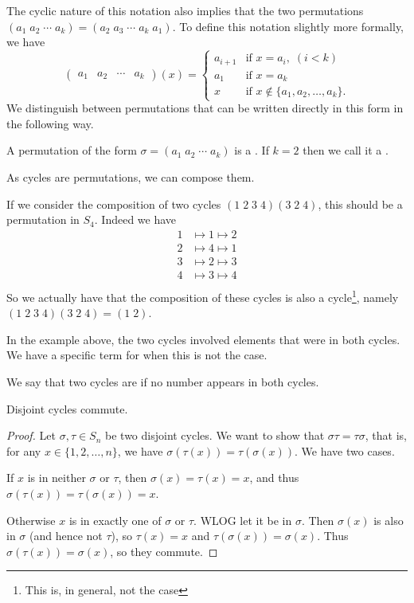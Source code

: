 \documentclass[a4]{scrreprt}
\begin{document}
The cyclic nature of this notation also implies that the two permutations $(a_1\; a_2\; \cdots\; a_k) = (a_2\; a_3\; \cdots\; a_k\; a_1)$. To define this notation slightly more formally, we have
$$
\begin{pmatrix}
	a_1 & a_2 & \cdots & a_k
\end{pmatrix} (x) = \begin{cases}
	a_{i + 1} &\mbox{if } x = a_i, \; (i < k) \\
	a_1 &\mbox{if } x = a_k \\
	x &\mbox{if } x \not \in \{a_1, a_2, \dots, a_k\}.
   \end{cases}
$$
We distinguish between permutations that can be written directly in this form in the following way.
\begin{definition}
	A permutation of the form $\sigma = (a_1\; a_2\; \cdots\; a_k)$ is a . If $k = 2$ then we call it a .
\end{definition}

As cycles are permutations, we can compose them.
\begin{example}
If we consider the composition of two cycles $(1\; 2\; 3\; 4)(3 \; 2\; 4)$, this should be a permutation in $S_4$. Indeed we have
\begin{align*}
	1 &\longmapsto 1 \longmapsto 2 \\
	2 &\longmapsto 4 \longmapsto 1 \\
	3 &\longmapsto 2 \longmapsto 3 \\
	4 &\longmapsto 3 \longmapsto 4 \\
\end{align*}
So we actually have that the composition of these cycles is also a cycle\footnote{This is, in general, not the case}, namely $(1\; 2\; 3\; 4)(3 \; 2\; 4) = (1\; 2)$. 
\end{example}

In the example above, the two cycles involved elements that were in both cycles. We have a specific term for when this is not the case.

\begin{definition}
	We say that two cycles are  if no number appears in both cycles.
\end{definition}
\begin{lemma}
	Disjoint cycles commute.
\end{lemma}
\begin{proof}
	Let $\sigma, \tau \in S_n$ be two disjoint cycles. We want to show that $\sigma \tau = \tau \sigma$, that is, for any $x \in \{1, 2, \dots, n\}$, we have $\sigma(\tau(x)) = \tau(\sigma(x))$. We have two cases.

	If $x$ is in neither $\sigma$ or $\tau$, then $\sigma(x) = \tau(x) = x$, and thus $\sigma(\tau(x)) = \tau(\sigma(x)) = x$.

	Otherwise $x$ is in exactly one of $\sigma$ or $\tau$. WLOG let it be in $\sigma$. Then $\sigma(x)$ is also in $\sigma$ (and hence not $\tau$), so $\tau(x) = x$ and $\tau(\sigma(x)) = \sigma(x)$. Thus $\sigma(\tau(x)) = \sigma(x)$, so they commute.
\end{proof}
\end{document}
